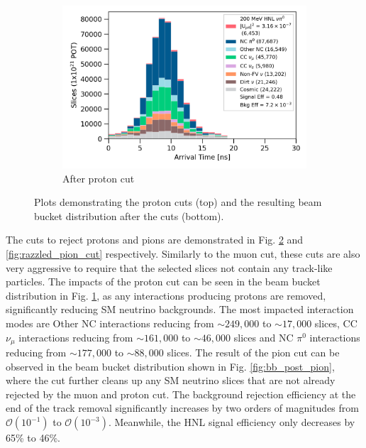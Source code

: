 \begin{figure}[b!]
\begin{subfigure}[b]{0.495\textwidth}
            \includegraphics[width=\textwidth]{beam_bucket_postproton}
            \caption{After proton cut}%
            \label{fig:bb_post_proton}
        \end{subfigure}
        \caption{
		Plots demonstrating the proton cuts (top) and the resulting beam bucket distribution after the cuts (bottom). 
	}
        \label{fig:razzled_proton_cut}
\end{figure}
The cuts to reject protons and pions are demonstrated in Fig. \ref{fig:razzled_proton_cut} and \ref{fig:razzled_pion_cut} respectively.
Similarly to the muon cut, these cuts are also very aggressive to require that the selected slices not contain any track-like particles.
The impacts of the proton cut can be seen in the beam bucket distribution in Fig. \ref{fig:bb_post_proton}, as any interactions producing protons are removed, significantly reducing SM neutrino backgrounds.
The most impacted interaction modes are Other NC interactions reducing from $\sim249,000$ to $\sim17,000$ slices, CC $\nu_\mu$ interactions reducing from $\sim161,000$ to $\sim46,000$ slices and NC $\pi^0$ interactions reducing from $\sim 177,000$ to $\sim88,000$ slices.
The result of the pion cut can be observed in the beam bucket distribution shown in Fig. \ref{fig:bb_post_pion}, where the cut further cleans up any SM neutrino slices that are not already rejected by the muon and proton cut.  
The background rejection efficiency at the end of the track removal significantly increases by two orders of magnitudes from $\mathcal{O}(10^{-1})$ to $\mathcal{O}(10^{-3})$.
Meanwhile, the HNL signal efficiency only decreases by 65\% to 46\%.

